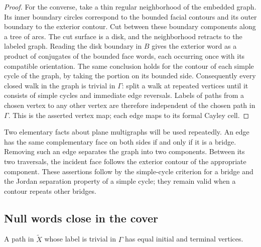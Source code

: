 \begin{proof}
For the converse, take a thin regular neighborhood of the embedded
graph.  Its inner boundary circles correspond to the bounded facial
contours and its outer boundary to the exterior contour.  Cut between
these boundary components along a tree of arcs.  The cut surface is a
disk, and the neighborhood retracts to the labeled graph.  Reading the
disk boundary in $B$ gives the exterior word as a product of conjugates
of the bounded face words, each occurring once with its compatible
orientation.  The same conclusion holds for the contour of each simple
cycle of the graph, by taking the portion on its bounded side.
Consequently every closed walk in the graph is trivial in $\Gamma$:
split a walk at repeated vertices until it consists of simple cycles
and immediate edge reversals.  Labels of paths from a chosen vertex to
any other vertex are therefore independent of the chosen path in
$\Gamma$.  This is the asserted vertex map; each edge maps to its formal
Cayley cell.
\end{proof}

Two elementary facts about plane multigraphs will be used repeatedly.
An edge has the same complementary face on both sides if and only if it
is a bridge.  Removing such an edge separates the graph into two
components.  Between its two traversals, the incident face follows the
exterior contour of the appropriate component.  These assertions follow
by the simple-cycle criterion for a bridge and the Jordan separation
property of a simple cycle; they remain valid when a contour repeats
other bridges.

\subsection{Null words close in the cover}

\begin{lemma}\label{lem:null-path-closes}
A path in $\widetilde X$ whose label is trivial in $\Gamma$ has equal
initial and terminal vertices.
\end{lemma}

